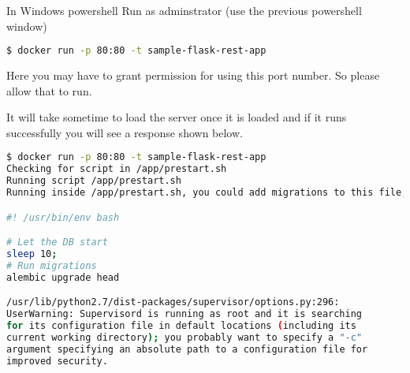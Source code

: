 In Windows powershell Run as adminstrator (use the previous powershell
window)

\begin{lstlisting}[language=bash]
$ docker run -p 80:80 -t sample-flask-rest-app
\end{lstlisting}

Here you may have to grant permission for using this port number. So
please allow that to run.

It will take sometime to load the server once it is loaded and if it
runs successfully you will see a response shown below.

\begin{lstlisting}[language=bash]
$ docker run -p 80:80 -t sample-flask-rest-app
Checking for script in /app/prestart.sh
Running script /app/prestart.sh
Running inside /app/prestart.sh, you could add migrations to this file, e.g.:

#! /usr/bin/env bash

# Let the DB start
sleep 10;
# Run migrations
alembic upgrade head

/usr/lib/python2.7/dist-packages/supervisor/options.py:296:
UserWarning: Supervisord is running as root and it is searching
for its configuration file in default locations (including its
current working directory); you probably want to specify a "-c"
argument specifying an absolute path to a configuration file for
improved security.


\end{lstlisting}
